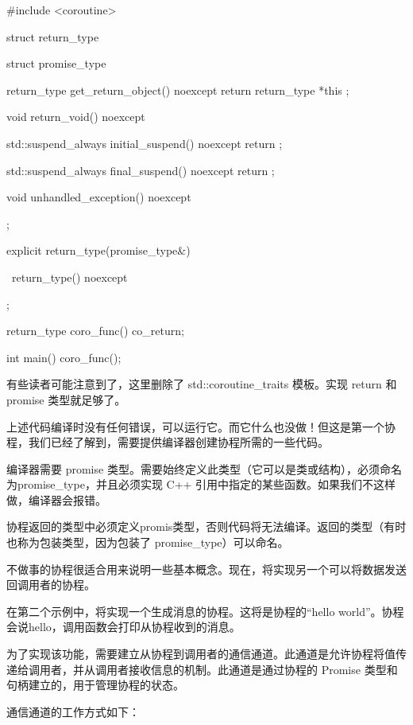 \begin{cpp}
#include <coroutine>

struct return_type {
    struct promise_type {
        return_type get_return_object() noexcept {
            return return_type{ *this };
        }

        void return_void() noexcept {}

        std::suspend_always initial_suspend() noexcept {
            return {};
        }

        std::suspend_always final_suspend() noexcept {
            return {};
        }

        void unhandled_exception() noexcept {}
    };

    explicit return_type(promise_type&) {
    }

    ~return_type() noexcept {
    }
};

return_type coro_func() {
    co_return;
}

int main() {
    coro_func();
}
\end{cpp}

有些读者可能注意到了，这里删除了 std::coroutine\_traits 模板。实现 return 和 promise 类型就足够了。

上述代码编译时没有任何错误，可以运行它。而它什么也没做！但这是第一个协程，我们已经了解到，需要提供编译器创建协程所需的一些代码。


编译器需要 promise 类型。需要始终定义此类型（它可以是类或结构），必须命名为promise\_type，并且必须实现 C++ 引用中指定的某些函数。如果我们不这样做，编译器会报错。

协程返回的类型中必须定义promis类型，否则代码将无法编译。返回的类型（有时也称为包装类型，因为包装了 promise\_type）可以命名。


不做事的协程很适合用来说明一些基本概念。现在，将实现另一个可以将数据发送回调用者的协程。

在第二个示例中，将实现一个生成消息的协程。这将是协程的“hello world”。协程会说hello，调用函数会打印从协程收到的消息。

为了实现该功能，需要建立从协程到调用者的通信通道。此通道是允许协程将值传递给调用者，并从调用者接收信息的机制。此通道是通过协程的 Promise 类型和句柄建立的，用于管理协程的状态。

通信通道的工作方式如下：

